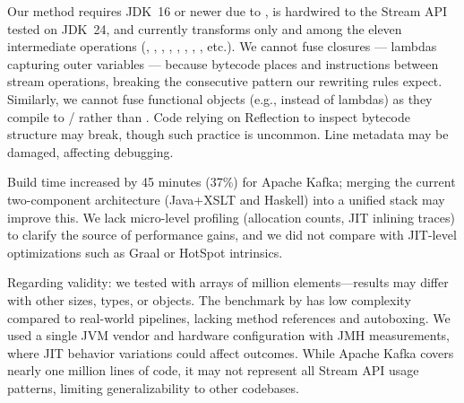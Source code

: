 
Our method requires JDK~16 or newer due to , is hardwired to the Stream API tested on JDK~24, and currently transforms only  and  among the eleven intermediate operations (, , , , , , , , etc.).
We cannot fuse closures --- lambdas capturing outer variables --- because bytecode places  and  instructions between stream operations, breaking the consecutive pattern our rewriting rules expect.
Similarly, we cannot fuse functional objects (e.g.,  instead of lambdas) as they compile to / rather than .
Code relying on Reflection to inspect bytecode structure may break, though such practice is uncommon.
Line metadata may be damaged, affecting debugging.

Build time increased by 45 minutes (37\%) for Apache Kafka; merging the current two-component architecture (Java+XSLT and Haskell) into a unified stack may improve this.
We lack micro-level profiling (allocation counts, JIT inlining traces) to clarify the source of performance gains, and we did not compare with JIT-level optimizations such as Graal or HotSpot intrinsics.

Regarding validity: we tested with arrays of  million  elements---results may differ with other sizes, types, or objects.
The benchmark by \citet{moller2020eliminating} has low complexity compared to real-world pipelines, lacking method references and autoboxing.
We used a single JVM vendor and hardware configuration with JMH measurements, where JIT behavior variations could affect outcomes.
While Apache Kafka covers nearly one million lines of code, it may not represent all Stream API usage patterns, limiting generalizability to other codebases.
